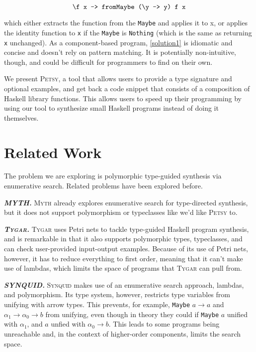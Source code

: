 \documentclass[acmsmall,nonacm]{acmart}
\begin{document}
\begin{equation}
  \label{solution1}
  \verb|\f x -> fromMaybe (\y -> y) f x|
\end{equation}

\noindent which either extracts the function from the \verb|Maybe| and applies it to x, 
or applies the identity function to \verb|x| if the \verb|Maybe| is \verb|Nothing|
(which is the same as returning \verb|x| unchanged). As a component-based program, 
\ref{solution1} is idiomatic and concise and doesn't rely on pattern matching. It is potentially 
non-intuitive, though, and could be difficult for programmers to find on their own. 

We present \textsc{Petsy}, a tool that allows users to provide a type signature and 
optional examples, and get back a code snippet 
that consists of a composition of Haskell library functions. This allows
users to speed up their programming by using our tool to synthesize small 
Haskell programs instead of doing it themselves. 




\section{Related Work}

The problem we are exploring is polymorphic type-guided synthesis via 
enumerative search. Related problems have been explored before. 

\vspace{2mm}
\noindent \textbf{\textit{MYTH.}} \textsc{Myth} \cite{myth}
already explores enumerative search for 
type-directed synthesis, but it does not support polymorphism or typeclasses 
like we'd like \textsc{Petsy} to. 

\vspace{2mm}
\noindent \textbf{\textit{\textsc{Tygar}.}} \textsc{Tygar} \cite{tygar} uses Petri nets to 
tackle type-guided Haskell program synthesis, and is remarkable in that 
it also supports polymorphic types, typeclasses, and can check 
user-provided input-output examples. Because of its use of Petri nets, 
however, it has to reduce everything to first order, meaning that 
it can't make use of lambdas, which limits the space of programs that
\textsc{Tygar} can pull from.

\vspace{2mm}
\noindent \textbf{\textit{SYNQUID.}} \textsc{Synquid} \cite{synquid} makes 
use of an enumerative search approach, lambdas, and polymorphism. 
Its type system, however, restricts type variables
from unifying with arrow types. This prevents, for example, 
\texttt{Maybe} ${a \to a}$ 
and ${\alpha_1 \to \alpha_0 \to b}$ from unifying, even though in theory
they could if \texttt{Maybe} $a$ unified with $\alpha_1$, and $a$ unfied 
with $\alpha_0 \to b$. This leads to some programs being unreachable
and, in the context of higher-order components, limits the search space. 
\end{document}
